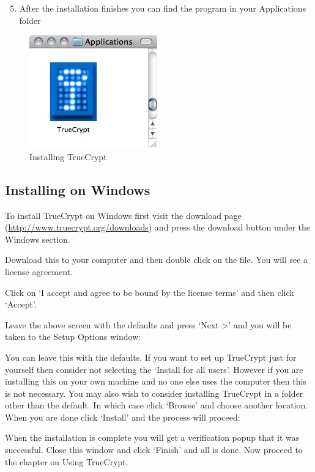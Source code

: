 \begin{enumerate}[1.]
\setcounter{enumi}{4}
\item
  After the installation finishes you can find the program in your
  Applications folder
\end{enumerate}
\begin{figure}[htbp]
\centering
\includegraphics{tc_013.jpg}
\caption{Installing TrueCrypt}
\end{figure}

\subsection{Installing on Windows}

To install TrueCrypt on Windows first visit the download page
(\href{http://www.truecrypt.org/downloads}{http://www.truecrypt.org/downloads})
and press the download button under the Windows section.

Download this to your computer and then double click on the file. You
will see a license agreement.

Click on `I accept and agree to be bound by the license terms' and then
click `Accept'.

Leave the above screen with the defaults and press `Next \textgreater{}'
and you will be taken to the Setup Options window:

You can leave this with the defaults. If you want to set up TrueCrypt
just for yourself then consider not selecting the `Install for all
users'. However if you are installing this on your own machine and no
one else uses the computer then this is not necessary. You may also wish
to consider installing TrueCrypt in a folder other than the default. In
which case click `Browse' and choose another location. When you are done
click `Install' and the process will proceed:

When the installation is complete you will get a verification popup that
it was successful. Close this window and click `Finish' and all is done.
Now proceed to the chapter on Using TrueCrypt.
